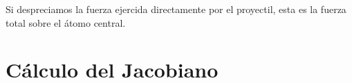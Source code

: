 Si despreciamos la fuerza ejercida directamente por el proyectil, esta es la fuerza total sobre el \'{a}tomo central.




\section{C\'{a}lculo del Jacobiano}
\label{S:calc-jacob}

